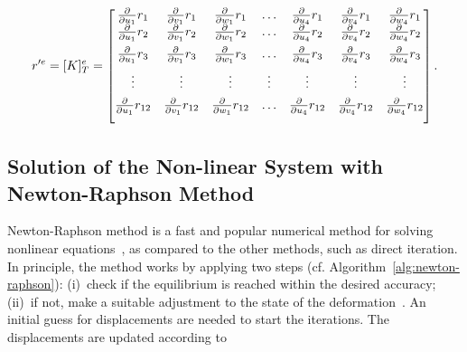 \begin{equation}
r'^{e}
=
[K]_{T}^e
=
\begin{bmatrix}
\frac{\partial{}}{\partial{u_{1}}}r_{1} & \frac{\partial{}}{\partial{v_{1}}}r_{1} & \frac{\partial{}}{\partial{w_{1}}}r_{1} & \hdots & \frac{\partial{}}{\partial{u_{4}}}r_{1} & \frac{\partial{}}{\partial{v_{4}}}r_{1} & \frac{\partial{}}{\partial{w_{4}}}r_{1} \\ \vspace*{1.0ex}
\frac{\partial{}}{\partial{u_{1}}}r_{2} & \frac{\partial{}}{\partial{v_{1}}}r_{2} & \frac{\partial{}}{\partial{w_{1}}}r_{2} & \hdots & \frac{\partial{}}{\partial{u_{4}}}r_{2} & \frac{\partial{}}{\partial{v_{4}}}r_{2} & \frac{\partial{}}{\partial{w_{4}}}r_{2} \\ \vspace*{1.0ex}
\frac{\partial{}}{\partial{u_{1}}}r_{3} & \frac{\partial{}}{\partial{v_{1}}}r_{3} & \frac{\partial{}}{\partial{w_{1}}}r_{3} & \hdots & \frac{\partial{}}{\partial{u_{4}}}r_{3} & \frac{\partial{}}{\partial{v_{4}}}r_{3} & \frac{\partial{}}{\partial{w_{4}}}r_{3} \\ \vspace*{1.0ex}
\vdots & \vdots & \vdots & \vdots & \vdots & \vdots & \vdots \\ \vspace*{1.0ex}
\frac{\partial{}}{\partial{u_{1}}}r_{12} & \frac{\partial{}}{\partial{v_{1}}}r_{12} & \frac{\partial{}}{\partial{w_{1}}}r_{12} & \hdots & \frac{\partial{}}{\partial{u_{4}}}r_{12} & \frac{\partial{}}{\partial{v_{4}}}r_{12} & \frac{\partial{}}{\partial{w_{4}}}r_{12} \vspace*{1.0ex}
\end{bmatrix}.
\label{eqn:4.6-4}
\end{equation}


\subsection{Solution of the Non-linear System with Newton-Raphson Method}

Newton-Raphson method is a fast and popular numerical method for solving nonlinear equations~\cite{Kelly87}, as compared to the other methods, such as direct iteration. In principle, the method works by applying two steps (cf. Algorithm~\ref{alg:newton-raphson}): (i)~check if the equilibrium is reached within the desired accuracy; (ii)~if not, make a suitable adjustment to the state of the deformation~\cite{Krenk09}. An initial guess for displacements are needed to start the iterations. The displacements are updated according to

